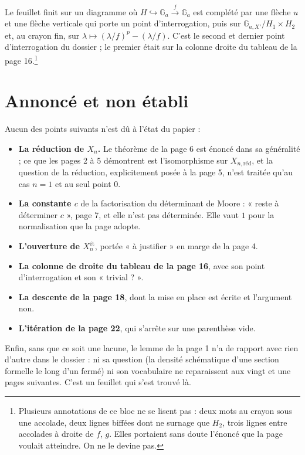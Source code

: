 \documentclass[11pt,a4paper]{article}
\begin{document}
Le feuillet finit sur un diagramme où $H \hookrightarrow \mathbb{G}_a
\xrightarrow{\ f\ } \mathbb{G}_a$ est complété par une flèche $u$ et une
flèche verticale qui porte un point d'interrogation, puis sur
$\mathbb{G}_{a,X'}/H_1 \times H_2$ et, au crayon fin, sur
$\lambda \mapsto (\lambda/f)^p - (\lambda/f)$. C'est le second et dernier
point d'interrogation du dossier ; le premier était sur la colonne droite du
tableau de la page 16.\footnote{Plusieurs annotations de ce bloc ne se lisent
pas : deux mots au crayon sous une accolade, deux lignes biffées dont ne
surnage que $H_2$, trois lignes entre accolades à droite de $f$, $g$. Elles
portaient sans doute l'énoncé que la page voulait atteindre. On ne le
devine pas.}

\section*{Annoncé et non établi}

Aucun des points suivants n'est dû à l'état du
papier :

\begin{itemize}
\item \textbf{La réduction de $X_n$.} Le théorème de la page 6 est énoncé
dans sa généralité ; ce que les pages 2 à 5 démontrent est l'isomorphisme sur
$X_{n,\mathrm{réd}}$, et la question de la réduction, explicitement posée à
la page 5, n'est traitée qu'au cas $n = 1$ et au seul point $0$.
\item \textbf{La constante $c$} de la factorisation du déterminant de Moore :
« reste à déterminer $c$ », page 7, et elle n'est pas déterminée. Elle vaut
$1$ pour la normalisation que la page adopte.
\item \textbf{L'ouverture de $X_n^{\text{ét}}$}, portée « à justifier » en
marge de la page 4.
\item \textbf{La colonne de droite du tableau de la page 16}, avec son point
d'interrogation et son « trivial ? ».
\item \textbf{La descente de la page 18}, dont la mise en place est écrite et
l'argument non.
\item \textbf{L'itération de la page 22}, qui s'arrête sur une parenthèse
vide.
\end{itemize}

Enfin, sans que ce soit une lacune, le lemme de la
page 1 n'a de rapport avec rien d'autre dans le dossier : ni sa question (la
densité schématique d'une section formelle le long d'un fermé) ni son
vocabulaire ne reparaissent aux vingt et une pages suivantes. C'est un
feuillet qui s'est trouvé là.
\end{document}
